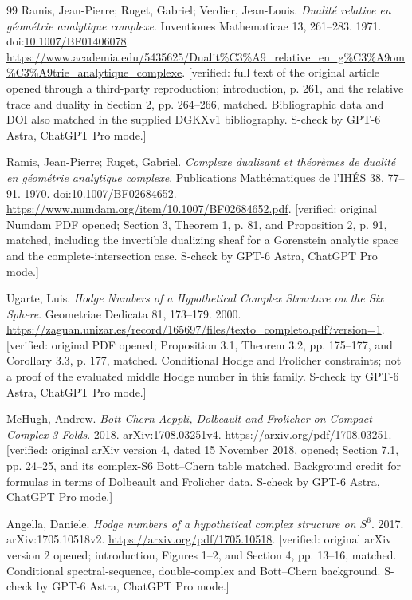 \begin{thebibliography}{99}
Ramis, Jean-Pierre; Ruget, Gabriel; Verdier, Jean-Louis. \emph{Dualit{\'e} relative en g{\'e}om{\'e}trie analytique complexe}. Inventiones Mathematicae 13, 261--283. 1971. doi:\url{10.1007/BF01406078}. \url{https://www.academia.edu/5435625/Dualit%C3%A9_relative_en_g%C3%A9om%C3%A9trie_analytique_complexe}. [verified: full text of the original article opened through a third-party reproduction; introduction, p. 261, and the relative trace and duality in Section 2, pp. 264--266, matched. Bibliographic data and DOI also matched in the supplied DGKXv1 bibliography. S-check by GPT-6 Astra, ChatGPT Pro mode.]

Ramis, Jean-Pierre; Ruget, Gabriel. \emph{Complexe dualisant et th{\'e}or{\`e}mes de dualit{\'e} en g{\'e}om{\'e}trie analytique complexe}. Publications Math{\'e}matiques de l'IH{\'E}S 38, 77--91. 1970. doi:\url{10.1007/BF02684652}. \url{https://www.numdam.org/item/10.1007/BF02684652.pdf}. [verified: original Numdam PDF opened; Section 3, Theorem 1, p. 81, and Proposition 2, p. 91, matched, including the invertible dualizing sheaf for a Gorenstein analytic space and the complete-intersection case. S-check by GPT-6 Astra, ChatGPT Pro mode.]

Ugarte, Luis. \emph{Hodge Numbers of a Hypothetical Complex Structure on the Six Sphere}. Geometriae Dedicata 81, 173--179. 2000. \url{https://zaguan.unizar.es/record/165697/files/texto_completo.pdf?version=1}. [verified: original PDF opened; Proposition 3.1, Theorem 3.2, pp. 175--177, and Corollary 3.3, p. 177, matched. Conditional Hodge and Frolicher constraints; not a proof of the evaluated middle Hodge number in this family. S-check by GPT-6 Astra, ChatGPT Pro mode.]

McHugh, Andrew. \emph{Bott-Chern-Aeppli, Dolbeault and Frolicher on Compact Complex 3-Folds}. 2018. arXiv:1708.03251v4. \url{https://arxiv.org/pdf/1708.03251}. [verified: original arXiv version 4, dated 15 November 2018, opened; Section 7.1, pp. 24--25, and its complex-S6 Bott--Chern table matched. Background credit for formulas in terms of Dolbeault and Frolicher data. S-check by GPT-6 Astra, ChatGPT Pro mode.]

Angella, Daniele. \emph{Hodge numbers of a hypothetical complex structure on $S^6$}. 2017. arXiv:1705.10518v2. \url{https://arxiv.org/pdf/1705.10518}. [verified: original arXiv version 2 opened; introduction, Figures 1--2, and Section 4, pp. 13--16, matched. Conditional spectral-sequence, double-complex and Bott--Chern background. S-check by GPT-6 Astra, ChatGPT Pro mode.]


\end{thebibliography}
